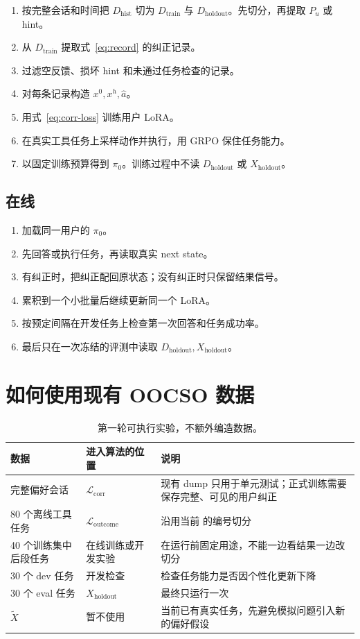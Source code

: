 \documentclass[11pt,UTF8,fontset=fandol]{ctexart}
\newcommand{\Dhist}{D_{\mathrm{hist}}}
\newcommand{\Dtrain}{D_{\mathrm{train}}}
\newcommand{\Dholdout}{D_{\mathrm{holdout}}}
\newcommand{\Xholdout}{X_{\mathrm{holdout}}}
\newcommand{\Xsim}{\widetilde X}
\begin{document}
\begin{enumerate}
  \item 按完整会话和时间把 \(\Dhist\) 切为 \(\Dtrain\) 与
    \(\Dholdout\)。先切分，再提取 \(P_u\) 或 hint。
  \item 从 \(\Dtrain\) 提取式~\eqref{eq:record} 的纠正记录。
  \item 过滤空反馈、损坏 hint 和未通过任务检查的记录。
  \item 对每条记录构造 \(x^0,x^h,\widehat a\)。
  \item 用式~\eqref{eq:corr-loss} 训练用户 LoRA。
  \item 在真实工具任务上采样动作并执行，用 GRPO 保住任务能力。
  \item 以固定训练预算得到 \(\pi_0\)。训练过程中不读
    \(\Dholdout\) 或 \(\Xholdout\)。
\end{enumerate}

\subsection{在线}

\begin{enumerate}
  \item 加载同一用户的 \(\pi_0\)。
  \item 先回答或执行任务，再读取真实 next state。
  \item 有纠正时，把纠正配回原状态；没有纠正时只保留结果信号。
  \item 累积到一个小批量后继续更新同一个 LoRA。
  \item 按预定间隔在开发任务上检查第一次回答和任务成功率。
  \item 最后只在一次冻结的评测中读取 \(\Dholdout,\Xholdout\)。
\end{enumerate}

\section{如何使用现有 OOCSO 数据}

\begin{table}[H]
  \centering
  \caption{第一轮可执行实验，不额外编造数据。}
  \begin{tabularx}{\textwidth}{@{}L{0.24\textwidth}L{0.31\textwidth}Y@{}}
    \toprule
    数据 & 进入算法的位置 & 说明 \\
    \midrule
    完整偏好会话 &
    \(\mathcal L_{\mathrm{corr}}\) &
    现有 dump 只用于单元测试；正式训练需要保存完整、可见的用户纠正 \\
    80 个离线工具任务 &
    \(\mathcal L_{\mathrm{outcome}}\) &
    沿用当前  的编号切分 \\
    40 个训练集中后段任务 &
    在线训练或开发实验 &
    在运行前固定用途，不能一边看结果一边改切分 \\
    30 个 dev 任务 &
    开发检查 &
    检查任务能力是否因个性化更新下降 \\
    30 个 eval 任务 &
    \(\Xholdout\) &
    最终只运行一次 \\
    \(\Xsim\) &
    暂不使用 &
    当前已有真实任务，先避免模拟问题引入新的偏好假设 \\
    \bottomrule
  \end{tabularx}
\end{table}
\end{document}
